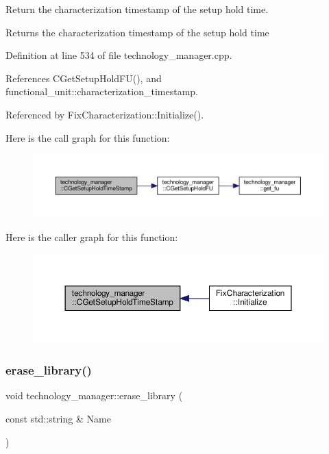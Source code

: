 Return the characterization timestamp of the setup hold time. 

\begin{DoxyReturn}{Returns}
the characterization timestamp of the setup hold time 
\end{DoxyReturn}


Definition at line 534 of file technology\+\_\+manager.\+cpp.



References C\+Get\+Setup\+Hold\+F\+U(), and functional\+\_\+unit\+::characterization\+\_\+timestamp.



Referenced by Fix\+Characterization\+::\+Initialize().

Here is the call graph for this function\+:
\nopagebreak
\begin{figure}[H]
\begin{center}
\leavevmode
\includegraphics[width=350pt]{df/dc7/classtechnology__manager_a4e1d25b7ad4c37cae201f371a7c4a9a1_cgraph}
\end{center}
\end{figure}
Here is the caller graph for this function\+:
\nopagebreak
\begin{figure}[H]
\begin{center}
\leavevmode
\includegraphics[width=350pt]{df/dc7/classtechnology__manager_a4e1d25b7ad4c37cae201f371a7c4a9a1_icgraph}
\end{center}
\end{figure}
\mbox{\label{classtechnology__manager_a17d5f85564ae7e7578966d0875ce9444}} 
\subsubsection{\texorpdfstring{erase\+\_\+library()}{erase\_library()}}
{\footnotesize\ttfamily void technology\+\_\+manager\+::erase\+\_\+library (\begin{DoxyParamCaption}\item[{const std\+::string \&}]{Name }\end{DoxyParamCaption})}




